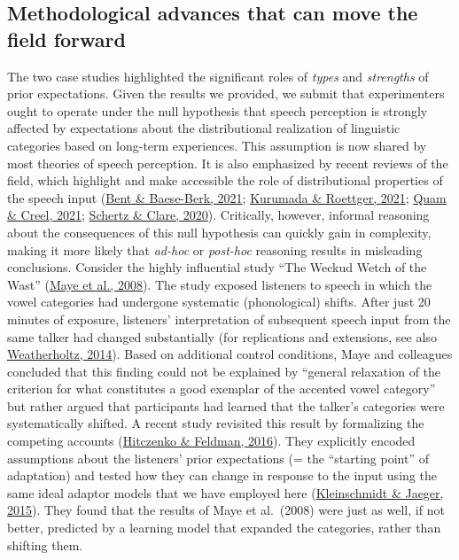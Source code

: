 \documentclass[
  11pt,
  english,
  man,floatsintext]{apa6}
\begin{document}
\hypertarget{methodological-advances-that-can-move-the-field-forward}{%
\subsection{Methodological advances that can move the field forward}\label{methodological-advances-that-can-move-the-field-forward}}

The two case studies highlighted the significant roles of \emph{types} and \emph{strengths} of prior expectations. Given the results we provided, we submit that experimenters ought to operate under the null hypothesis that speech perception is strongly affected by expectations about the distributional realization of linguistic categories based on long-term experiences. This assumption is now shared by most theories of speech perception. It is also emphasized by recent reviews of the field, which highlight and make accessible the role of distributional properties of the speech input (\protect\hyperlink{ref-bent-baeseberk2021}{Bent \& Baese-Berk, 2021}; \protect\hyperlink{ref-kurumada-roettger2021}{Kurumada \& Roettger, 2021}; \protect\hyperlink{ref-quam-creel2021}{Quam \& Creel, 2021}; \protect\hyperlink{ref-schertz-clare2020}{Schertz \& Clare, 2020}). Critically, however, informal reasoning about the consequences of this null hypothesis can quickly gain in complexity, making it more likely that \emph{ad-hoc} or \emph{post-hoc} reasoning results in misleading conclusions. Consider the highly influential study ``The Weckud Wetch of the Wast'' (\protect\hyperlink{ref-maye2008}{Maye et al., 2008}). The study exposed listeners to speech in which the vowel categories had undergone systematic (phonological) shifts. After just 20 minutes of exposure, listeners' interpretation of subsequent speech input from the same talker had changed substantially (for replications and extensions, see also \protect\hyperlink{ref-weatherholtz2014}{Weatherholtz, 2014}). Based on additional control conditions, Maye and colleagues concluded that this finding could not be explained by ``general relaxation of the criterion for what constitutes a good exemplar of the accented vowel category'' but rather argued that participants had learned that the talker's categories were systematically shifted. A recent study revisited this result by formalizing the competing accounts (\protect\hyperlink{ref-hitczenko-feldman2016}{Hitczenko \& Feldman, 2016}). They explicitly encoded assumptions about the listeners' prior expectations (= the ``starting point'' of adaptation) and tested how they can change in response to the input using the same ideal adaptor models that we have employed here (\protect\hyperlink{ref-kleinschmidt-jaeger2015}{Kleinschmidt \& Jaeger, 2015}). They found that the results of Maye et al.~(2008) were just as well, if not better, predicted by a learning model that expanded the categories, rather than shifting them.
\end{document}
